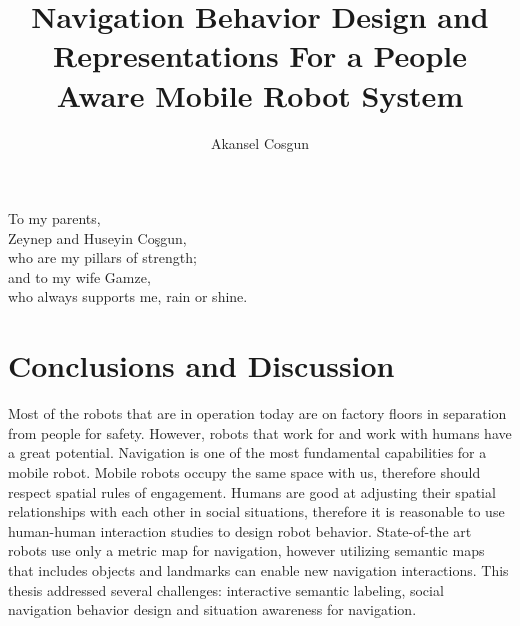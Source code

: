 \documentclass[12pt]{gatech-thesis}
\title{Navigation Behavior Design and Representations For a People Aware Mobile Robot System}
\author{Akansel Cosgun}
\begin{document}
%

\begin{preliminary}

\begin{dedication}
\null\vfil
{\large
\begin{center}
To my parents,\\\vspace{12pt}
Zeynep and Huseyin Co\c{s}gun,\\\vspace{12pt}
who are my pillars of strength;\\\vspace{12pt}
and to my wife Gamze,\\\vspace{12pt}
who always supports me, rain or shine.\\\vspace{12pt}
\end{center}}
\vfil\null
\end{dedication}




\contents

\end{preliminary}









\chapter{Conclusions and Discussion}
\label{chapter:conclusion}

Most of the robots that are in operation today are on factory floors in separation from people for safety. However, robots that work for and work with humans have a great potential. Navigation is one of the most fundamental capabilities for a mobile robot. Mobile robots occupy the same space with us, therefore should respect spatial rules of engagement. Humans are good at adjusting their spatial relationships with each other in social situations, therefore it is reasonable to use human-human interaction studies to design robot behavior. State-of-the art robots use only a metric map for navigation, however utilizing semantic maps that includes objects and landmarks can enable new navigation interactions. This thesis addressed several challenges: interactive semantic labeling, social navigation behavior design and situation awareness for navigation. 
\end{document}
